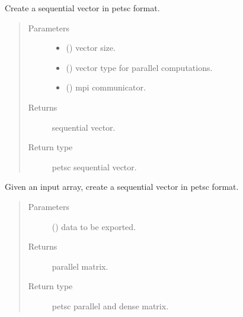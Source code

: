 \documentclass[letterpaper,10pt,english]{sphinxmanual}
\begin{document}
\begin{fulllineitems}
\label{\detokenize{petgem/parallel:petgem.parallel.createSequentialVector}}
Create a sequential vector in petsc format.
\begin{quote}\begin{description}
\item[{Parameters}] \leavevmode\begin{itemize}
\item {} 
 () \textendash{} vector size.

\item {} 
 () \textendash{} vector type for parallel computations.

\item {} 
 () \textendash{} mpi communicator.

\end{itemize}

\item[{Returns}] \leavevmode
sequential vector.

\item[{Return type}] \leavevmode
petsc sequential vector.

\end{description}\end{quote}

\end{fulllineitems}


\begin{fulllineitems}
\label{\detokenize{petgem/parallel:petgem.parallel.createSequentialVectorWithArray}}
Given an input array, create a sequential vector in petsc format.
\begin{quote}\begin{description}
\item[{Parameters}] \leavevmode
{} () \textendash{} data to be exported.

\item[{Returns}] \leavevmode
parallel matrix.

\item[{Return type}] \leavevmode
petsc parallel and dense matrix.

\end{description}\end{quote}

\end{fulllineitems}
\end{document}

